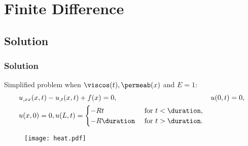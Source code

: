 \documentclass[compress]{beamer}%
\begin{document}
\section{Finite Difference}
\subsection{Solution}

\begin{frame}
  \frametitle{Solution}

  Simplified problem when ${\viscos(t)},{\permeab(x)}$ and $E=1$:
\begin{align}
  \label{eq:heat}
  &u_{,xx}(x,t) - u_{,t}(x,t) + f(x) 
  = 0,&& u(0,t) = 0, \\\nonumber
             &u(x,0) = 0, u(L,t) =
            \begin{cases}
              -Rt &\text{ for } t < \duration,\\
              -R\duration &\text{ for } t > \duration.
            \end{cases}
\end{align}

\begin{figure}
  \centering
  \texttt{[image: heat.pdf]}
  \label{fig:findiff-heat}
\end{figure}

\end{frame}
\end{document}
